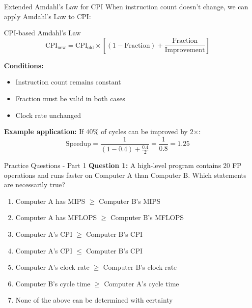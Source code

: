 \documentclass[aspectratio=169,12pt]{beamer}
\begin{document}
\begin{frame}{Extended Amdahl's Law for CPI}
When instruction count doesn't change, we can apply Amdahl's Law to CPI:

\begin{block}{CPI-based Amdahl's Law}
$$\text{CPI}_{\text{new}} = \text{CPI}_{\text{old}} \times \left[(1 - \text{Fraction}) + \frac{\text{Fraction}}{\text{Improvement}}\right]$$
\end{block}

\textbf{Conditions:}
\begin{itemize}
    \item Instruction count remains constant
    \item Fraction must be valid in both cases
    \item Clock rate unchanged
\end{itemize}

\textbf{Example application:}
If 40\% of cycles can be improved by 2×:
$$\text{Speedup} = \frac{1}{(1 - 0.4) + \frac{0.4}{2}} = \frac{1}{0.8} = 1.25$$
\end{frame}

\begin{frame}{Practice Questions - Part 1}
\textbf{Question 1:} A high-level program contains 20 FP operations and runs faster on Computer A than Computer B. Which statements are necessarily true?

\begin{enumerate}
    \item Computer A has MIPS $\geq$ Computer B's MIPS
    \item Computer A has MFLOPS $\geq$ Computer B's MFLOPS
    \item Computer A's CPI $\geq$ Computer B's CPI
    \item Computer A's CPI $\leq$ Computer B's CPI
    \item Computer A's clock rate $\geq$ Computer B's clock rate
    \item Computer B's cycle time $\geq$ Computer A's cycle time
    \item None of the above can be determined with certainty
\end{enumerate}\end{frame}
\end{document}
